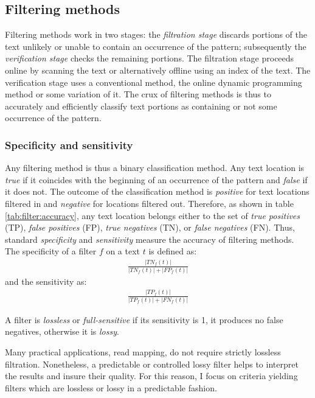 
\subsection{Filtering methods}
\label{sec:intro:filtering}

Filtering methods work in two stages: the \emph{filtration stage} discards portions of the text unlikely or unable to contain an occurrence of the pattern; subsequently the \emph{verification stage} checks the remaining portions.
The filtration stage proceeds online by scanning the text or alternatively offline using an index of the text.
The verification stage uses a conventional method, \eg the online dynamic programming method or some variation of it.
The crux of filtering methods is thus to accurately and efficiently classify text portions as containing or not some occurrence of the pattern.

\subsubsection{Specificity and sensitivity}
\label{intro:filtering:spec-sens}

Any filtering method is thus a binary classification method.
Any text location is \emph{true} if it coincides with the beginning of an occurrence of the pattern and \emph{false} if it does not.
The outcome of the classification method is \emph{positive} for text locations filtered in and \emph{negative} for locations filtered out.
Therefore, as shown in table \ref{tab:filter:accuracy}, any text location belongs either to the set of \emph{true positives} (TP), \emph{false positives} (FP), \emph{true negatives} (TN), or \emph{false negatives} (FN).
Thus, standard \emph{specificity} and \emph{sensitivity} measure the accuracy of filtering methods.
The specificity of a filter $f$ on a text $t$ is defined as:
\begin{eqnarray}
\frac{|TN_f(t)|}{|TN_f(t)| + |FP_f(t)|}
\end{eqnarray}
and the sensitivity as:
\begin{eqnarray}
\frac{|TP_f(t)|}{|TP_f(t)| + |FN_f(t)|}
\end{eqnarray}

\begin{definition}
A filter is \emph{lossless} or \emph{full-sensitive} if its sensitivity is 1, \ie it produces no false negatives, otherwise it is \emph{lossy}.
\end{definition}
Many practical applications, \eg read mapping, do not require strictly lossless filtration.
Nonetheless, a predictable or controlled lossy filter helps to interpret the results and insure their quality.
For this reason, I focus on criteria yielding filters which are lossless or lossy in a predictable fashion.

